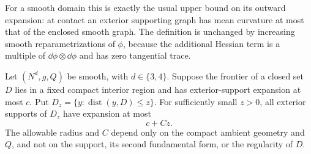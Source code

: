 For a smooth domain this is exactly the usual upper bound on its
outward expansion: at contact an exterior supporting graph has mean
curvature at most that of the enclosed smooth graph.  The definition
is unchanged by increasing smooth reparametrizations of $\phi$,
because the additional Hessian term is a multiple of
$\dd\phi\otimes\dd\phi$ and has zero tangential trace.

\begin{lemma}
\label{n3:domains:parallel-support}
Let $(N^d,g,Q)$ be smooth, with $d\in\{3,4\}$.  Suppose the
frontier of a closed set $D$ lies in a fixed compact interior
region and has exterior-support expansion at most $c$.  Put
$D_z=\{y:\operatorname{dist}(y,D)\leq z\}$.  For sufficiently small
$z>0$, all exterior supports of $D_z$ have expansion at most
\begin{equation}\label{n3:domains:parallel-estimate}
 c+Cz.
\end{equation}
The allowable radius and $C$ depend only on the compact ambient
geometry and $Q$, and not on the support, its second fundamental
form, or the regularity of $D$.
\end{lemma}

